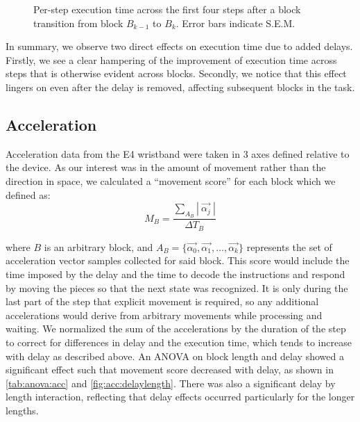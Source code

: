\documentclass[10pt,letterpaper]{article}
\begin{document}
\begin{figure}[h]
  \centering
  \caption{Per-step execution time across the first four steps after a block transition from block \( B_{k-1} \) to \( B_k \). Error bars indicate S.E.M.}\label{fig:exectime:transition}%
\end{figure}

In summary, we observe two direct effects on execution time due to added delays.
Firstly, we see a clear hampering of the improvement of execution time across steps that is otherwise evident across blocks.
Secondly, we notice that this effect lingers on even after the delay is removed, affecting subsequent blocks in the task.

\subsection{Acceleration}

Acceleration data from the E4 wristband were taken in 3 axes defined relative to the device.
As our interest was in the amount of movement rather than the direction in space, we calculated a ``movement score'' for each block which we defined as:
\begin{equation}
    M_B = \frac{ \sum_{A_B} |\: \overrightarrow{\alpha_j} \:| }{\Delta T_{B}}
\end{equation}

where \( B \) is an arbitrary block, and \(A_{B} = \{ \overrightarrow{\alpha_0}, \overrightarrow{\alpha_1}, \ldots, \overrightarrow{\alpha_k} \} \) represents the set of acceleration vector samples collected for said block.
This score would include the time imposed by the delay and the time to decode the instructions and respond by moving the pieces so that the next state was recognized.
It is only during the last part of the step that explicit movement is required, so any additional accelerations would derive from arbitrary movements while processing and waiting.
We normalized the sum of the accelerations by the duration of the step to correct for differences in delay and the execution time, which tends to increase with delay as described above.
An ANOVA on block length and delay showed a significant effect such that movement score decreased with delay, as shown in \cref{tab:anova:acc} and \cref{fig:acc:delaylength}.
There was also a significant delay by length interaction, reflecting that delay effects occurred particularly for the longer lengths.
\end{document}
